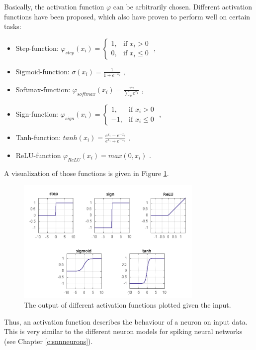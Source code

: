 Basically, the activation function $\varphi$ can be arbitrarily chosen. 
Different activation functions have been proposed, which also have proven to perform well on certain tasks:

\begin{itemize}
	\item Step-function: $\varphi_{step}(x_i) = \begin{cases} 1, & \text{if  } x_i > 0 \\ 0, & \text{if  } x_i \le 0  \end{cases}$ , 
	\item Sigmoid-function: $\sigma(x_i) = \frac{1}{1 + e^{-x_i}}$ ,
	\item Softmax-function: $\varphi_{softmax}(x_i) = \frac{e^{x_i}}{\sum_k e^{x_k}}$ ,
	\item Sign-function: $\varphi_{sign}(x_i) = \begin{cases} 1, & \text{if  } x_i > 0 \\ -1, & \text{if  } x_i \le 0  \end{cases}$ ,
	\item Tanh-function: $tanh(x_i) = \frac{e^{x_i} - e^{-x_i}}{e^{x_i} + e^{-x_i}}$ ,
	\item ReLU-function $\varphi_{ReLU}(x_i) = max(0, x_i)$ .
\end{itemize}

A visualization of those functions is given in Figure \ref{fig:activations}.

\begin{figure}
	\centering
    	\includegraphics[width=0.8\textwidth]{imgs/act_fun.png} 
    \caption{The output of different activation functions plotted given the input.}
	\label{fig:activations}
\end{figure}

Thus, an activation function describes the behaviour of a neuron on input data.
This is very similar to the different neuron models for spiking neural networks (see Chapter \ref{c:snnneurons}).


